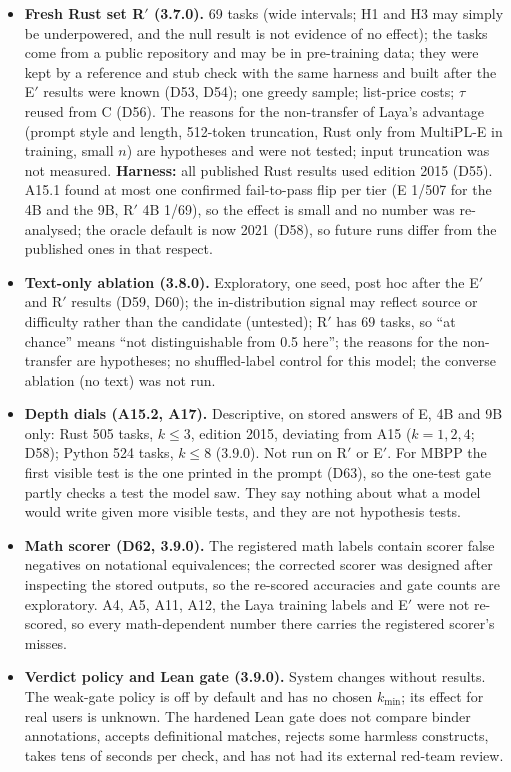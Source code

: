 \documentclass[11pt,a4paper]{article}
\begin{document}
\begin{itemize}
\item \textbf{Fresh Rust set R$'$ (3.7.0).} 69 tasks (wide intervals; H1 and H3 may simply be underpowered, and the null result is not evidence of no effect); the tasks come from a public repository and may be in pre-training data; they were kept by a reference and stub check with the same harness and built after the E$'$ results were known (D53, D54); one greedy sample; list-price costs; $\tau$ reused from C (D56). The reasons for the non-transfer of Laya's advantage (prompt style and length, 512-token truncation, Rust only from MultiPL-E in training, small $n$) are hypotheses and were not tested; input truncation was not measured. \textbf{Harness:} all published Rust results used edition 2015 (D55). A15.1 found at most one confirmed fail-to-pass flip per tier (E 1/507 for the 4B and the 9B, R$'$ 4B 1/69), so the effect is small and no number was re-analysed; the oracle default is now 2021 (D58), so future runs differ from the published ones in that respect.
\item \textbf{Text-only ablation (3.8.0).} Exploratory, one seed, post hoc after the E$'$ and R$'$ results (D59, D60); the in-distribution signal may reflect source or difficulty rather than the candidate (untested); R$'$ has 69 tasks, so ``at chance'' means ``not distinguishable from 0.5 here''; the reasons for the non-transfer are hypotheses; no shuffled-label control for this model; the converse ablation (no text) was not run.
\item \textbf{Depth dials (A15.2, A17).} Descriptive, on stored answers of E, 4B and 9B only: Rust 505 tasks, $k\le3$, edition 2015, deviating from A15 ($k=1,2,4$; D58); Python 524 tasks, $k\le8$ (3.9.0). Not run on R$'$ or E$'$. For MBPP the first visible test is the one printed in the prompt (D63), so the one-test gate partly checks a test the model saw. They say nothing about what a model would write given more visible tests, and they are not hypothesis tests.
\item \textbf{Math scorer (D62, 3.9.0).} The registered math labels contain scorer false negatives on notational equivalences; the corrected scorer was designed after inspecting the stored outputs, so the re-scored accuracies and gate counts are exploratory. A4, A5, A11, A12, the Laya training labels and E$'$ were not re-scored, so every math-dependent number there carries the registered scorer's misses.
\item \textbf{Verdict policy and Lean gate (3.9.0).} System changes without results. The weak-gate policy is off by default and has no chosen $k_{\min}$; its effect for real users is unknown. The hardened Lean gate does not compare binder annotations, accepts definitional matches, rejects some harmless constructs, takes tens of seconds per check, and has not had its external red-team review.

\end{itemize}
\end{document}
